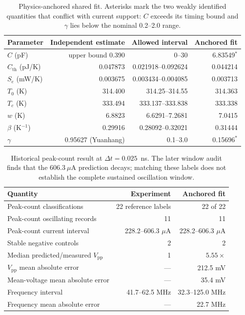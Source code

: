 \documentclass[11pt]{article}
\begin{document}
\begin{table}[H]
\centering
\scriptsize
{}
\begin{tabular}{@{}l r r r@{}}
\toprule
Parameter & Independent estimate & Allowed interval & Anchored fit \\
\midrule
$C$ (pF) & upper bound 0.390 & 0--30 & 6.83549$^{*}$ \\
$C_{\mathrm{th}}$ (pJ/K) & 0.047873 & 0.021918--0.092624 & 0.044214 \\
$S_e$ (mW/K) & 0.003675 & 0.003434--0.004085 & 0.003713 \\
$T_0$ (K) & 314.400 & 314.25--314.55 & 314.363 \\
$T_c$ (K) & 333.494 & 333.137--333.838 & 333.338 \\
$w$ (K) & 6.8823 & 6.6291--7.2681 & 7.0415 \\
$\beta$ (K$^{-1}$) & 0.29916 & 0.28092--0.32021 & 0.31444 \\
$\gamma$ & 0.95627 (Yuanhang) & 0.1--3.0 & 0.15696$^{*}$ \\
\bottomrule
\end{tabular}
\caption{Physics-anchored shared fit. Asterisks mark the two weakly identified
quantities that conflict with current support: $C$ exceeds its timing bound and
$\gamma$ lies below the nominal 0.2--2.0 range.}
\label{tab:physics_anchored_parameters}
\end{table}

\begin{table}[H]
\centering
\small
{}
\begin{tabular}{@{}l r r@{}}
\toprule
Quantity & Experiment & Anchored fit \\
\midrule
Peak-count classifications & 22 reference labels & 22 of 22 \\
Peak-count oscillating records & 11 & 11 \\
Peak-count current interval & 228.2--606.3 $\mu$A & 228.2--606.3 $\mu$A \\
Stable negative controls & 2 & 2 \\
Median predicted/measured $V_{\mathrm{pp}}$ & 1 & $5.55\times$ \\
$V_{\mathrm{pp}}$ mean absolute error & --- & 212.5 mV \\
Mean-voltage mean absolute error & --- & 35.4 mV \\
Frequency interval & 41.7--62.5 MHz & 32.3--125.0 MHz \\
Frequency mean absolute error & --- & 22.7 MHz \\
\bottomrule
\end{tabular}
\caption{Historical peak-count result at $\Delta t=0.025$~ns. The later window
audit finds that the $606.3~\mu$A prediction decays; matching these labels does not
establish the complete sustained oscillation window.}
\label{tab:physics_anchored_results}
\end{table}
\end{document}
